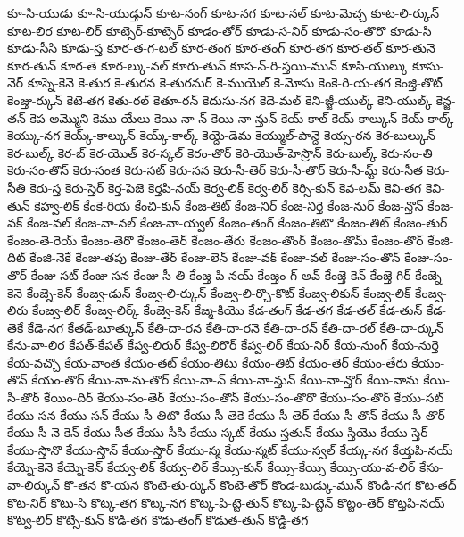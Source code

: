 {కూ-సి-యుడు
కూ-సి-యుడ్తున్
కూట-నంగ్
కూట-నగ
కూట-నల్
కూట-మెచ్చ
కూట-లి-ర్కున్
కూట-లిర
కూట-లిర్
కూట్సెర్-కూట్సెర్
కూడం-తోర్
కూడు-స-నిర్
కూడు-సం-తొరొ
కూడు-సి
కూడు-సీసి
కూడు-స్త
కూర-త-గ-టల్
కూర-తంగ
కూర-తంగ్
కూర-తగ
కూర-తల్
కూర-తునె
కూర-తున్
కూర-తె
కూర-ల్కు-నల్
కూరు-తున్
కూస-న్-రి-స్తయి-మున్
కూసి-యుల్కు
కూసు-నెర్
కూస్నె-కెనె
కె-తుర
కె-తురన
కె-తురనుర్
కె-ముయెల్
కె-మోసు
కెంకె-రి-య-తగ
కెంజ్తి-తొట్
కెంజ్తు-ర్కున్
కెటె-తగ
కెతు-రల్
కెతూ-రన్
కెదుసు-నగ
కెదె-మల్
కెని-జ్జీ-యుల్క్
కెని-యుల్క్
కెన్జ-తన్
కెప-అమ్మొని
కెము-యేలు
కెయి-నా-న్
కెయి-నా-న్తున్
కెయ్-కాల్
కెయ్-కాల్కున్
కెయ్-కాల్క్
కెయ్కు-నగ
కెయ్క్-కాల్కున్
కెయ్క్-కాల్క్
కెయ్దె-డెమ
కెయ్ముల్-పాన్దె
కెయ్స-రన
కెర-బుల్కున్
కెర-బుల్క్
కెర-బ్
కెర-యొత్
కెర-స్కల్
కెరం-తొర్
కెరి-యొత్-హెస్రొన్
కెరు-బుల్క్
కెరు-సం-తి
కెరు-సం-తొన్
కెరు-సంత
కెరు-సట్
కెరు-సన
కెరు-సీ-తెర్
కెరు-సీ-తొర్
కెరు-సీ-మ్ట్
కెరు-సీత
కెరు-సీతి
కెరు-స్త
కెరు-స్తెర్
కెర్త-పెజె
కెర్తపి-నయ్
కెర్వ-లిక్
కెర్వ-లిర్
కెర్సి-కున్
కెవ-లమ్
కెవి-తగ
కెవి-తున్
కెహ్వ-లిక్
కేంకె-రియ
కేంచి-కున్
కేంజ-తిట్
కేంజ-నిర్
కేంజ-నిర్తె
కేంజ-నుర్
కేంజ-న్తొన్
కేంజ-వక్
కేంజ-వల్
కేంజ-వా-నల్
కేంజ-వా-య్వల్
కేంజం-తంగ్
కేంజం-తిటొ
కేంజం-తిట్
కేంజం-తుర్
కేంజం-తె-రెయ్
కేంజం-తెరొ
కేంజం-తెర్
కేంజం-తేరు
కేంజం-తొంర్
కేంజం-తొమ్
కేంజం-తొర్
కేంజి-దిట్
కేంజి-నెకే
కేంజు-తపు
కేంజు-తేర్
కేంజు-లెన్
కేంజు-వక్
కేంజు-వల్
కేంజు-సం-తొన్
కేంజు-సం-తొర్
కేంజు-సట్
కేంజు-సన
కేంజు-సీ-తి
కేంజ్త-పి-నయ్
కేంజ్తం-గ్-అవ్
కేంజ్తె-కెన్
కేంజ్తె-గిర్
కేంజ్నె-కెనె
కేంజ్నె-కెన్
కేంజ్వ-డున్
కేంజ్వ-లి-ర్కున్
కేంజ్వ-లి-ర్చొ-కొట్
కేంజ్వ-లికున్
కేంజ్వ-లిక్
కేంజ్వ-లిరు
కేంజ్వ-లిర్
కేంజ్వ-లిర్క్
కేంజ్వె-కెన్
కేజ్మ-కియొ
కేడ-తంగ్
కేడ-తగ
కేడ-తల్
కేడ-తున్
కేడ-తెకే
కేడె-నగ
కేతడ్-బూత్కున్
కేతి-దా-రన
కేతి-దా-రనె
కేతి-దా-రన్
కేతి-దా-రల్
కేతి-దా-ర్కున్
కేను-వా-లిర
కేపత్-కేపత్
కేప్వ-లిరుర్
కేప్వ-లిరొర్
కేప్వ-లిర్
కేయ-నిర్
కేయ-నుంగ్
కేయ-నుర్తె
కేయ-వచ్చొ
కేయ-వాంత
కేయం-తట్
కేయం-తిటు
కేయం-తిట్
కేయం-తెర్
కేయం-తేరు
కేయం-తొన్
కేయం-తొర్
కేయి-నా-ను-తొర్
కేయి-నా-న్
కేయి-నా-న్తున్
కేయి-నా-న్తొర్
కేయి-నాను
కేయి-సీ-తొర్
కేయిం-దిర్
కేయు-సం-తెర్
కేయు-సం-తొన్
కేయు-సం-తొరొ
కేయు-సం-తొర్
కేయు-సట్
కేయు-సన
కేయు-సన్
కేయు-సీ-తిటొ
కేయు-సీ-తెకె
కేయు-సీ-తెర్
కేయు-సీ-తొన్
కేయు-సీ-తొర్
కేయు-సీ-నె-కెన్
కేయు-సీత
కేయు-సీసి
కేయు-స్కట్
కేయు-స్తతున్
కేయు-స్తియొ
కేయు-స్తెర్
కేయు-స్తొనొ
కేయు-స్తొన్
కేయు-స్తొర్
కేయు-స్మ
కేయు-స్మట్
కేయు-స్వల్
కేయ్క-నగ
కేయ్తపి-నయ్
కేయ్నె-కెనె
కేయ్నె-కెన్
కేయ్వ-లిక్
కేయ్వ-లిర్
కేయ్సి-కున్
కేయ్సి-కేయ్సి
కేయ్సి-యు-వ-లిర్
కేసు-వా-లిర్కున్
కొ-తన
కొ-యన
కొంటె-తు-ర్కున్
కొంటె-తొర్
కొండ-బుడ్కు-మున్
కొండి-నగ
కొట-తద్
కొట-నిర్
కొటు-సి
కొట్క-తగ
కొట్క-నగ
కొట్క-పి-ట్టె-తున్
కొట్క-పి-ట్టెన్
కొట్టం-తెర్
కొట్తపి-నయ్
కొట్వ-లిర్
కొట్సి-కున్
కొడి-తగ
కొడు-తంగ్
కొడుత-తున్
కొడ్డి-తగ
}
